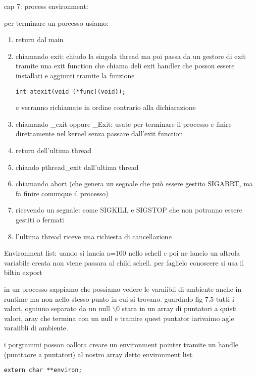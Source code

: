 
cap 7:
process environment:

per terminare un porcesso usiamo:

\begin{enumerate}
    \item return dal main
    \item chiamando exit: chiudo la singola thread ma poi passa da un gestore di exit tramite una exit function che chiama deli exit handler che posson essere installati e aggiunti tramite la funzione
\begin{lstlisting}
int atexit(void (*func)(void));
\end{lstlisting}
    e verranno richiamate in ordine contrario alla dichiarazione
    
    \item chiamando \_exit oppure \_Exit: usate per terminare il processo e finire direttamente nel kernel senza passare dall'exit function
    \item return dell'ultima thread
    \item chiando pthread\_exit dall'ultima thread
    \item chiamando abort (che genera un segnale che può essere gestito SIGABRT, ma fa finire comunque il processo)
    \item ricevendo un segnale: come SIGKILL e SIGSTOP che non potranno essere gestiti o fermati
    \item l'ultima thread riceve una richiesta di cancellazione
\end{enumerate}



Environment list:
uando si lancia a=100 nello schell e poi ne lancio un altrola variabile creata non viene passara al child schell. per faglielo conoscere si usa il biltin export

in un processo sappiamo che possiamo vedere le varaiibli di ambiente anche in runtime ma non nello stesso punto in cui si trovano. guardndo fig 7.5 tutti i valori, ogniuno separato da un null $\backslash 0$ stara in un array di puntatori a quisti valori, aray che termina con un null e tramire quest puntator iarivaimo agle varaiibli di ambiente.

i porgrammi posson oallora creare un environment pointer tramite un handle (punttaore a puntatori) al nostro array detto environment list. 

\begin{lstlisting}
extern char **environ;
\end{lstlisting}

